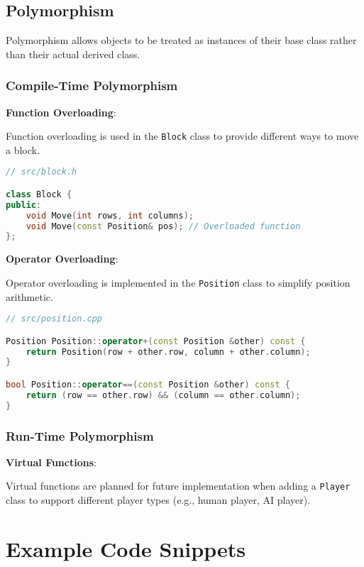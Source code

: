 \documentclass{article}
\begin{document}
\subsection{Polymorphism}

Polymorphism allows objects to be treated as instances of their base class rather than their actual derived class.

\subsubsection{Compile-Time Polymorphism}

\textbf{Function Overloading}:

Function overloading is used in the \texttt{Block} class to provide different ways to move a block.

\begin{lstlisting}[language=C++]
// src/block.h

class Block {
public:
    void Move(int rows, int columns);
    void Move(const Position& pos); // Overloaded function
};
\end{lstlisting}

\textbf{Operator Overloading}:

Operator overloading is implemented in the \texttt{Position} class to simplify position arithmetic.

\begin{lstlisting}[language=C++]
// src/position.cpp

Position Position::operator+(const Position &other) const {
    return Position(row + other.row, column + other.column);
}

bool Position::operator==(const Position &other) const {
    return (row == other.row) && (column == other.column);
}
\end{lstlisting}

\subsubsection{Run-Time Polymorphism}

\textbf{Virtual Functions}:

Virtual functions are planned for future implementation when adding a \texttt{Player} class to support different player types (e.g., human player, AI player).

\section{Example Code Snippets}
\end{document}
